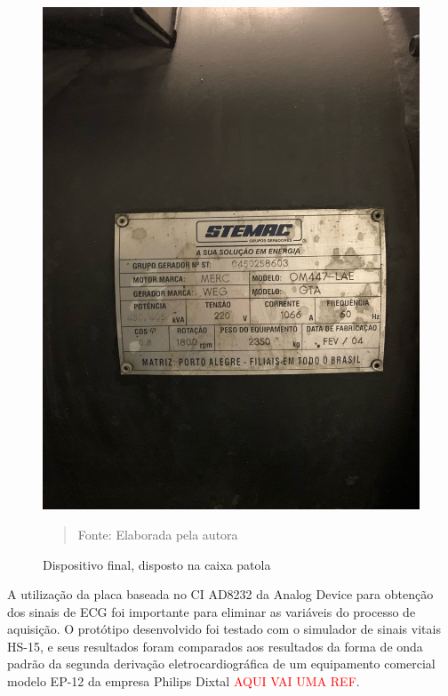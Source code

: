 \begin{figure}[H]
\begin{center}
			\caption{Dispositivo final, disposto na caixa patola}
			\includegraphics[width=.9\textwidth]{Figuras/info_gerador_450.jpeg}
              \vspace*{\fill} 
            \begin{quote} 
            \centering 
           Fonte: Elaborada pela autora
            \end{quote}
            \vspace*{\fill}
			
			\label{fig:mama}
\end{center}
\end{figure}
A utilização da placa baseada no CI AD8232 da Analog Device para obtenção dos sinais de ECG foi importante para eliminar as variáveis do processo de aquisição. O protótipo desenvolvido foi testado com o simulador de sinais vitais HS-15, e seus resultados foram comparados aos resultados da forma de onda padrão da segunda derivação eletrocardiográfica de um equipamento comercial modelo EP-12 da empresa Philips Dixtal \textcolor{red}{AQUI VAI UMA REF}.

